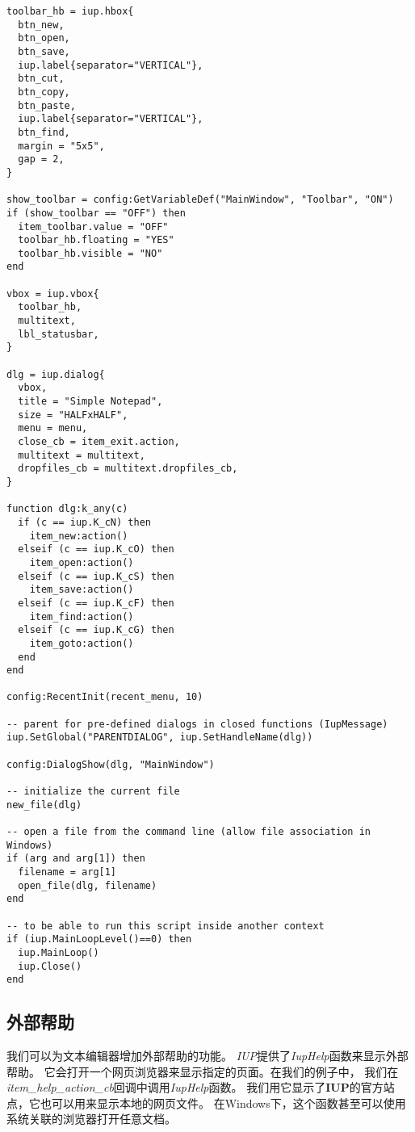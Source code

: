 \documentclass{ctexart}
\begin{document}
\begin{lstlisting}
toolbar_hb = iup.hbox{
  btn_new,
  btn_open,
  btn_save,
  iup.label{separator="VERTICAL"},
  btn_cut,
  btn_copy,
  btn_paste,
  iup.label{separator="VERTICAL"},
  btn_find, 
  margin = "5x5",
  gap = 2,
}

show_toolbar = config:GetVariableDef("MainWindow", "Toolbar", "ON")
if (show_toolbar == "OFF") then
  item_toolbar.value = "OFF"
  toolbar_hb.floating = "YES"
  toolbar_hb.visible = "NO"
end

vbox = iup.vbox{
  toolbar_hb,
  multitext,
  lbl_statusbar,
}

dlg = iup.dialog{
  vbox,
  title = "Simple Notepad",
  size = "HALFxHALF",
  menu = menu,
  close_cb = item_exit.action,
  multitext = multitext,
  dropfiles_cb = multitext.dropfiles_cb,
}

function dlg:k_any(c)
  if (c == iup.K_cN) then
    item_new:action()
  elseif (c == iup.K_cO) then
    item_open:action()
  elseif (c == iup.K_cS) then
    item_save:action()
  elseif (c == iup.K_cF) then
    item_find:action()
  elseif (c == iup.K_cG) then
    item_goto:action()
  end
end

config:RecentInit(recent_menu, 10)

-- parent for pre-defined dialogs in closed functions (IupMessage)
iup.SetGlobal("PARENTDIALOG", iup.SetHandleName(dlg))

config:DialogShow(dlg, "MainWindow")

-- initialize the current file
new_file(dlg)

-- open a file from the command line (allow file association in Windows)
if (arg and arg[1]) then
  filename = arg[1]
  open_file(dlg, filename)
end

-- to be able to run this script inside another context
if (iup.MainLoopLevel()==0) then
  iup.MainLoop()
  iup.Close()
end
\end{lstlisting}

\subsection{外部帮助}

我们可以为文本编辑器增加外部帮助的功能。
\emph{IUP}提供了\emph{IupHelp}函数来显示外部帮助。
它会打开一个网页浏览器来显示指定的页面。在我们的例子中，
我们在\emph{item\_help\_action\_cb}回调中调用\emph{IupHelp}函数。
我们用它显示了\textbf{IUP}的官方站点，它也可以用来显示本地的网页文件。
在Windows下，这个函数甚至可以使用系统关联的浏览器打开任意文档。
\end{document}
